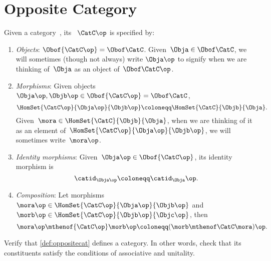 
\section{Opposite Category}

\begin{ctdefinition}
    \label{def:opposite-category}
    \label{def:oppositecat}
    Given a category~\CatC, its \emph{}~$\CatC\op$ is specified by:
    \begin{enumerate}
        \item \emph{Objects}: $\Obof{\CatC\op} = \Obof\CatC$.
              Given~$\Obja \in  \Obof\CatC$, we will sometimes (though not always) write $\Obja\op$ to signify when we are thinking of~$\Obja$ as an object of~$\Obof\CatC\op$.

        \item \emph{Morphisms}: Given objects~$\Obja\op,  \Objb\op \in \Obof{\CatC\op} = \Obof\CatC$,
              \begin{equation}
                  \label{eq:homset-op-cat}
                  \HomSet{\CatC\op}{\Obja\op}{\Objb\op} \coloneqq \HomSet{\CatC}{\Objb}{\Obja}.
              \end{equation}
              Given~$\mora \in \HomSet{\CatC}{\Objb}{\Obja}$, when we are thinking of it as an element of~$\HomSet{\CatC\op}{\Obja\op}{\Objb\op}$, we will sometimes write~$\mora\op$.
        \item \emph{Identity morphisms}: Given~$\Obja\op \in \Obof{\CatC\op}$, its identity morphism is
              \begin{equation}
                  \catid_{\Obja\op} \coloneqq \catid_{\Obja}\op.
              \end{equation}
        \item \emph{Composition}: Let morphisms~$\mora\op \in \HomSet{\CatC\op}{\Obja\op}{\Objb\op}$ and $\morb\op \in \HomSet{\CatC\op}{\Objb\op}{\Objc\op}$, then
              \begin{equation}
                  \mora\op \mthenof{\CatC\op} \morb\op \coloneqq (\morb \mthenof\CatC \mora)\op.
              \end{equation}
    \end{enumerate}
\end{ctdefinition}

\vfill
\begin{gradedexercise}
    \label{ex:OppositeCat}
    Verify that \cref{def:oppositecat} defines a category.
    In other words, check that its constituents satisfy the conditions of associative and unitality.
\end{gradedexercise}

